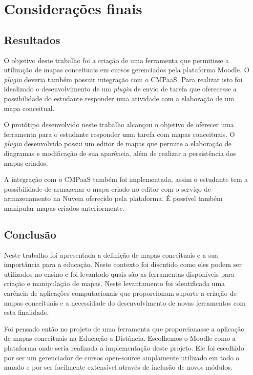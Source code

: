 \documentclass[
	12pt,				%
	openright,			%
	oneside,			%
	a4paper,			%
	english,			%
	french,				%
	spanish,			%
	brazil				%
	]{abntex2}
\begin{document}
\chapter{Considerações finais}

\section{Resultados}

O objetivo deste trabalho foi a criação de uma ferramenta que permitisse a utilização de mapas conceituais em cursos gerenciados pela plataforma Moodle. O \textit{plugin}  deveria também possuir integração com o CMPaaS. Para realizar isto foi idealizado o desenvolvimento de um \textit{plugin} de envio de tarefa que oferecesse a possibilidade do estudante responder uma atividade com a elaboração de um mapa conceitual.

O protótipo desenvolvido neste trabalho alcançou o objetivo de oferecer uma ferramenta para o estudante responder uma tarefa com mapas conceituais. O \textit{plugin} desenvolvido possui um editor de mapas que permite a elaboração de diagramas e modificação de sua aparência, além de realizar a persistência dos mapas criados. 

A integração com o CMPaaS também foi implementada, assim o estudante tem a possibilidade de armazenar o mapa criado no editor com o serviço de armazenamento na Nuvem oferecido pela plataforma. É possível também manipular mapas criados anteriormente. 



\section{Conclusão}

Neste trabalho foi apresentada a definição de mapas conceituais e a sua importância para a educação. Neste contexto foi discutido como eles podem ser utilizados no ensino e foi levantado quais são as ferramentas disponíveis para criação e manipulação de mapas. Neste levantamento foi identificada uma carência de aplicações computacionais que proporcionam suporte a criação de mapas conceituais e a necessidade do desenvolvimento de novas ferramentas com esta finalidade.

Foi pensado então no projeto de uma ferramenta que proporcionasse a aplicação de mapas conceituais na Educação a Distância. Escolhemos o Moodle como a plataforma onde seria realizada a implementação deste projeto. Ele foi escolhido por ser um gerenciador de cursos open-source amplamente utilizado em todo o mundo e por ser facilmente extensível através de inclusão de novos módulos.
\end{document}
